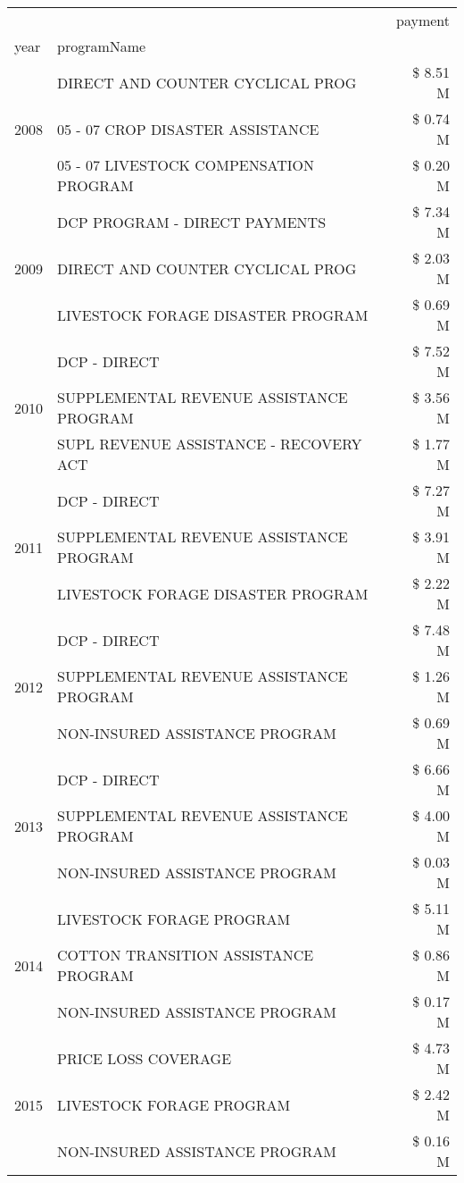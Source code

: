 \begin{tabular}{llr}
\toprule
 &  & payment \\
year & programName &  \\
\midrule
\multirow[t]{3}{*}{2008} & DIRECT AND COUNTER CYCLICAL PROG & \$ 8.51 M \\
 & 05 - 07 CROP DISASTER ASSISTANCE & \$ 0.74 M \\
 & 05 - 07 LIVESTOCK COMPENSATION PROGRAM & \$ 0.20 M \\
\cline{1-3}
\multirow[t]{3}{*}{2009} & DCP PROGRAM - DIRECT PAYMENTS & \$ 7.34 M \\
 & DIRECT AND COUNTER CYCLICAL PROG & \$ 2.03 M \\
 & LIVESTOCK FORAGE DISASTER  PROGRAM & \$ 0.69 M \\
\cline{1-3}
\multirow[t]{3}{*}{2010} & DCP - DIRECT & \$ 7.52 M \\
 & SUPPLEMENTAL REVENUE ASSISTANCE PROGRAM & \$ 3.56 M \\
 & SUPL REVENUE ASSISTANCE - RECOVERY ACT & \$ 1.77 M \\
\cline{1-3}
\multirow[t]{3}{*}{2011} & DCP - DIRECT & \$ 7.27 M \\
 & SUPPLEMENTAL REVENUE ASSISTANCE PROGRAM & \$ 3.91 M \\
 & LIVESTOCK FORAGE DISASTER PROGRAM & \$ 2.22 M \\
\cline{1-3}
\multirow[t]{3}{*}{2012} & DCP - DIRECT & \$ 7.48 M \\
 & SUPPLEMENTAL REVENUE ASSISTANCE PROGRAM & \$ 1.26 M \\
 & NON-INSURED ASSISTANCE PROGRAM & \$ 0.69 M \\
\cline{1-3}
\multirow[t]{3}{*}{2013} & DCP - DIRECT & \$ 6.66 M \\
 & SUPPLEMENTAL REVENUE ASSISTANCE PROGRAM & \$ 4.00 M \\
 & NON-INSURED ASSISTANCE PROGRAM & \$ 0.03 M \\
\cline{1-3}
\multirow[t]{3}{*}{2014} & LIVESTOCK FORAGE PROGRAM & \$ 5.11 M \\
 & COTTON TRANSITION ASSISTANCE PROGRAM & \$ 0.86 M \\
 & NON-INSURED ASSISTANCE PROGRAM & \$ 0.17 M \\
\cline{1-3}
\multirow[t]{3}{*}{2015} & PRICE LOSS COVERAGE & \$ 4.73 M \\
 & LIVESTOCK FORAGE PROGRAM & \$ 2.42 M \\
 & NON-INSURED ASSISTANCE PROGRAM & \$ 0.16 M \\
\cline{1-3}

\end{tabular}
